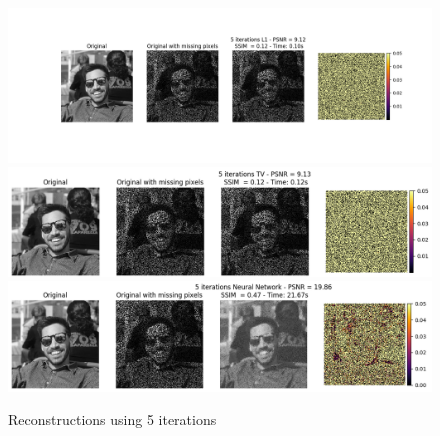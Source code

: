 \documentclass{article}
\begin{document}
\begin{enumerate}[label=2.\arabic*]
    \begin{figure}[H]
        \centering
        \includegraphics[trim={4.5cm 3.5cm 2.5cm 0cm},clip,width=\textwidth]{img/l1_5.png}
        \includegraphics[trim={.5cm .25cm .25cm 0cm},clip,width=\textwidth]{img/tv_5.png}
        \includegraphics[trim={.5cm .25cm .25cm 0cm},clip,width=\textwidth]{img/nn_5.png}
        \caption{Reconstructions using 5 iterations}
        \label{fig:5}
    \end{figure}
\end{enumerate}
\end{document}
